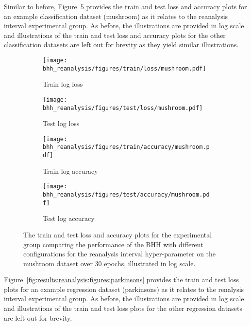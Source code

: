 Similar to before, Figure~\ref{fig:results:reanalysis:figures:mushroom} provides the train and test loss and accuracy plots for an example classification dataset (mushroom) as it relates to the reanalysis interval experimental group. As before, the illustrations are provided in log scale and illustrations of the train and test loss and accuracy plots for the other classification datasets are left out for brevity as they yield similar illustrations.

\begin{figure}[htb]
      \begin{subfigure}{0.5\textwidth}
            \centering
            \texttt{[image: bhh\_reanalysis/figures/train/loss/mushroom.pdf]}
            \caption{Train log loss}
            \label{fig:results:reanalysis:figures:loss:train:mushroom}
      \end{subfigure}
      \begin{subfigure}{0.5\textwidth}
            \centering
            \texttt{[image: bhh\_reanalysis/figures/test/loss/mushroom.pdf]}
            \caption{Test log loss}
            \label{fig:results:reanalysis:figures:loss:test:mushroom}
      \end{subfigure}
      \par\bigskip
      \begin{subfigure}{0.5\textwidth}
            \centering
            \texttt{[image: bhh\_reanalysis/figures/train/accuracy/mushroom.pdf]}
            \caption{Train log accuracy}
            \label{fig:results:reanalysis:figures:accuracy:train:mushroom}
      \end{subfigure}
      \begin{subfigure}{0.5\textwidth}
            \centering
            \texttt{[image: bhh\_reanalysis/figures/test/accuracy/mushroom.pdf]}
            \caption{Test log accuracy}
            \label{fig:results:reanalysis:figures:accuracy:test:mushroom}
      \end{subfigure}
      \par\bigskip
      \caption{The train and test loss and accuracy plots for the experimental group comparing the performance of the \acs{BHH} with different configurations for the reanalysis interval hyper-parameter on the mushroom dataset over 30 epochs, illustrated in log scale.}
      \label{fig:results:reanalysis:figures:mushroom}
\end{figure}

Figure~\ref{fig:results:reanalysis:figures:parkinsons} provides the train and test loss plots for an example regression dataset (parkinsons) as it relates to the renalysis interval experimental group. As before, the illustrations are provided in log scale and illustrations of the train and test loss plots for the other regression datasets are left out for brevity.

